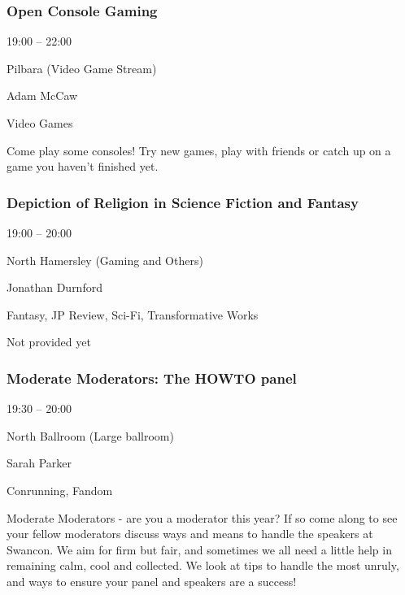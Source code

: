 \documentclass{scrreprt}
\begin{document}
\begin{multicols}{2}
\subsubsection*{Open Console Gaming}\begin{description}
\setlength{\itemsep}{0pt}
\setlength{\parsep}{0pt}
\setlength{\parskip}{0pt}
\item[Time:]{19:00 -- 22:00}
\item[Venue:]{Pilbara (Video Game Stream)}
\item[People:]{Adam McCaw}
\item[Tags:]{Video Games}\end{description}
Come play some consoles! Try new games, play with friends or catch up on a game you haven't finished yet.
\subsubsection*{Depiction of Religion in Science Fiction and Fantasy}\begin{description}
\setlength{\itemsep}{0pt}
\setlength{\parsep}{0pt}
\setlength{\parskip}{0pt}
\item[Time:]{19:00 -- 20:00}
\item[Venue:]{North Hamersley (Gaming and Others)}
\item[People:]{Jonathan Durnford}
\item[Tags:]{Fantasy, JP Review, Sci-Fi, Transformative Works}\end{description}
Not provided yet
\subsubsection*{Moderate Moderators: The HOWTO panel}\begin{description}
\setlength{\itemsep}{0pt}
\setlength{\parsep}{0pt}
\setlength{\parskip}{0pt}
\item[Time:]{19:30 -- 20:00}
\item[Venue:]{North Ballroom (Large ballroom)}
\item[People:]{Sarah Parker}
\item[Tags:]{Conrunning, Fandom}\end{description}
Moderate Moderators - are you a moderator this year? If so come along to see your fellow moderators discuss ways and means to handle the speakers at Swancon. We aim for firm but fair, and sometimes we all need a little help in remaining calm, cool and collected. We look at tips to handle the most unruly, and ways to ensure your panel and speakers are a success!

\end{multicols}
\end{document}

